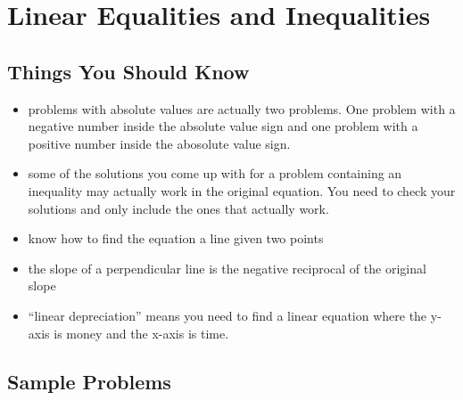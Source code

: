\documentclass[fleqn,addpoints]{exam}
\begin{document}
\section{Linear Equalities and Inequalities}

\subsection{Things You Should Know}
\begin{itemize}
\item problems with absolute values are actually two problems.  One problem with a negative number inside the absolute
  value sign and one problem with a positive number inside the abosolute value sign.
\item some of the solutions you come up with for a problem containing an inequality may actually work in the original
  equation.  You need to check your solutions and only include the ones that actually work.
\item know how to find the equation a line given two points
\item the slope of a perpendicular line is the negative reciprocal of the original slope
\item ``linear depreciation'' means you need to find a linear equation where the y-axis is money and the x-axis is time.
\end{itemize}

\subsection{Sample Problems}
\end{document}
